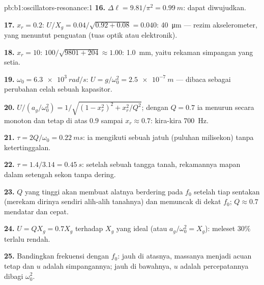 \begin{solution}{pb:b1:oscillators-resonance:1}
\textbf{16.} $\Delta\ell = 9.81/\pi^2 = \qty{0.99}{m}$: dapat diwujudkan.

\textbf{17.} $x_r = 0.2$: $U/X_g = 0.04/\sqrt{0.92 + 0.08} = 0.040$:
\qty{40}{\micro m} --- rezim akselerometer, yang menuntut penguatan
(tuas optik atau elektronik).

\textbf{18.} $x_r = 10$: $100/\sqrt{9801 + 204} \approx 1.00$: \qty{1.0}{mm},
yaitu rekaman simpangan yang setia.

\textbf{19.} $\omega_0 = \qty{6.3e3}{rad/s}$: $U = g/\omega_0^2 = \qty{2.5e-7}{m}$
--- dibaca sebagai perubahan celah sebuah kapasitor.

\textbf{20.} $U/(a_g/\omega_0^2) = 1/\sqrt{(1 - x_r^2)^2 + x_r^2/Q^2}$; dengan
$Q = 0.7$ ia menurun secara monoton dan tetap di atas $0.9$ sampai
$x_r \approx 0.7$: kira-kira \qty{700}{Hz}.

\textbf{21.} $\tau = 2Q/\omega_0 = \qty{0.22}{ms}$: ia mengikuti sebuah
jatuh (puluhan milisekon) tanpa ketertinggalan.

\textbf{22.} $\tau = 1.4/3.14 = \qty{0.45}{s}$: setelah sebuah tangga
tanah, rekamannya mapan dalam setengah sekon tanpa dering.

\textbf{23.} $Q$ yang tinggi akan membuat alatnya berdering pada $f_0$
setelah tiap sentakan (merekam dirinya sendiri alih-alih tanahnya) dan
memuncak di dekat $f_0$; $Q \approx 0.7$ mendatar dan cepat.

\textbf{24.} $U = QX_g = 0.7X_g$ terhadap $X_g$ yang ideal (atau $a_g/\omega_0^2
= X_g$): meleset $30\%$ terlalu rendah.

\textbf{25.} Bandingkan frekuensi  dengan $f_0$: jauh di
atasnya, massanya menjadi acuan tetap dan $u$ adalah simpangannya; jauh
di bawahnya, $u$ adalah percepatannya dibagi $\omega_0^2$.
\end{solution}
